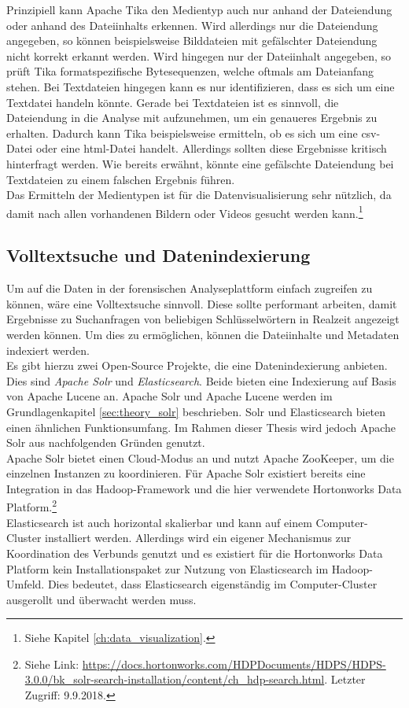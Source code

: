 \noindent
Prinzipiell kann Apache Tika den Medientyp auch nur anhand der Dateiendung oder anhand des Dateiinhalts erkennen. Wird allerdings nur die Dateiendung angegeben, so können beispielsweise Bilddateien mit gefälschter Dateiendung nicht korrekt erkannt werden. Wird hingegen nur der Dateiinhalt angegeben, so prüft Tika formatspezifische Bytesequenzen, welche oftmals am Dateianfang stehen. Bei Textdateien hingegen kann es nur identifizieren, dass es sich um eine Textdatei handeln könnte. Gerade bei Textdateien ist es sinnvoll, die Dateiendung in die Analyse mit aufzunehmen, um ein genaueres Ergebnis zu erhalten. Dadurch kann Tika beispielsweise ermitteln, ob es sich um eine \acrshort{csv}-Datei oder eine \acrshort{html}-Datei handelt. Allerdings sollten diese Ergebnisse kritisch hinterfragt werden. Wie bereits erwähnt, könnte eine gefälschte Dateiendung bei Textdateien zu einem falschen Ergebnis führen.\\
Das Ermitteln der Medientypen ist für die Datenvisualisierung sehr nützlich, da damit nach allen vorhandenen Bildern oder Videos gesucht werden kann.\footnote{Siehe Kapitel \ref{ch:data_visualization}.}

\subsection{Volltextsuche und Datenindexierung}
\label{subsec:file_indexing}
Um auf die Daten in der forensischen Analyseplattform einfach zugreifen zu können, wäre eine Volltextsuche sinnvoll. Diese sollte performant arbeiten, damit Ergebnisse zu Suchanfragen von beliebigen Schlüsselwörtern in Realzeit angezeigt werden können. Um dies zu ermöglichen, können die Dateiinhalte und Metadaten indexiert werden.\\

\noindent 
Es gibt hierzu zwei Open-Source Projekte, die eine Datenindexierung anbieten. Dies sind \textit{Apache Solr\texttrademark} und \textit{Elasticsearch\texttrademark}. Beide bieten eine Indexierung auf Basis von Apache Lucene an. Apache Solr und Apache Lucene werden im Grundlagenkapitel \ref{sec:theory_solr} beschrieben. Solr und Elasticsearch bieten einen ähnlichen Funktionsumfang. Im Rahmen dieser Thesis wird jedoch Apache Solr aus nachfolgenden Gründen genutzt.\\
Apache Solr bietet einen Cloud-Modus an und nutzt Apache ZooKeeper, um die einzelnen Instanzen zu koordinieren. Für Apache Solr existiert bereits eine Integration in das Hadoop-Framework und die hier verwendete Hortonworks Data Platform.\footnote{Siehe Link: \url{https://docs.hortonworks.com/HDPDocuments/HDPS/HDPS-3.0.0/bk_solr-search-installation/content/ch_hdp-search.html}. Letzter Zugriff: 9.9.2018.}\\
Elasticsearch ist auch horizontal skalierbar und kann auf einem Computer-Cluster installiert werden. Allerdings wird ein eigener Mechanismus zur Koordination des Verbunds genutzt und es existiert für die Hortonworks Data Platform kein Installationspaket zur Nutzung von Elasticsearch im Hadoop-Umfeld. Dies bedeutet, dass Elasticsearch eigenständig im Computer-Cluster ausgerollt und überwacht werden muss.\\

